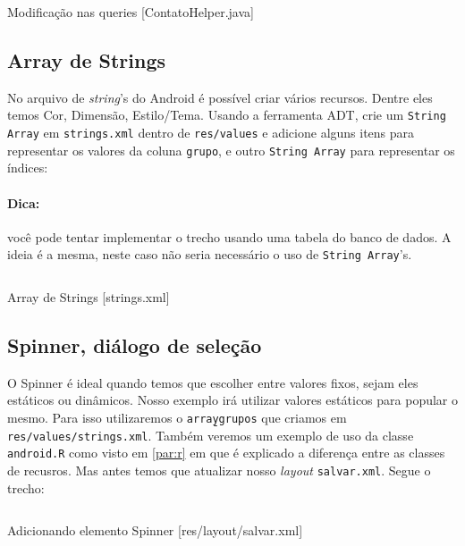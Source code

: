 \begin{listing}[H]
  \inputminted[linenos=true,frame=bottomline,tabsize=3]{ java }{ source/ContatoHelper-7.java }
  \caption{Modificação nas queries [ContatoHelper.java]}
\end{listing}

\subsection{Array de Strings}

No arquivo de \textit{string}'s do Android é possível criar vários recursos. Dentre eles temos Cor,
Dimensão, Estilo/Tema. Usando a ferramenta ADT, crie um \texttt{String Array} em \texttt{strings.xml}
dentro de \texttt{res/values} e adicione alguns itens para representar os valores da coluna \texttt{grupo},
e outro \texttt{String Array} para representar os índices:

\paragraph{Dica:} você pode tentar implementar o trecho usando uma tabela do banco de dados. A ideia
é a mesma, neste caso não seria necessário o uso de \texttt{String Array}'s.

\begin{listing}[H]
  \inputminted[linenos=true,frame=bottomline,tabsize=3]{ xml }{ source/strings-1.xml }
  \caption{Array de Strings [strings.xml]}
\end{listing}

\subsection{Spinner, diálogo de seleção}

O Spinner é ideal quando temos que escolher entre valores fixos, sejam eles estáticos ou dinâmicos.
Nosso exemplo irá utilizar valores estáticos para popular o mesmo. Para isso utilizaremos o
\texttt{array\b{ }grupos} que criamos em \texttt{res/values/strings.xml}. Também veremos um exemplo
de uso da classe \texttt{android.R} como visto em \ref{par:r} em que é explicado a diferença entre
as classes de recusros. Mas antes temos que atualizar nosso \textit{layout} \texttt{salvar.xml}.
Segue o trecho:

\begin{listing}[H]
  \inputminted[linenos=true,frame=bottomline,tabsize=3]{ xml }{ source/salvar-3.xml }
  \caption{Adicionando elemento Spinner [res/layout/salvar.xml]}
\end{listing}

